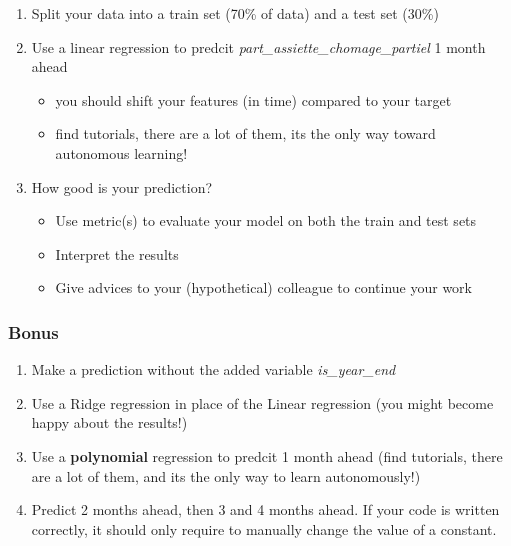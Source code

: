\begin{enumerate}
    \item Split your data into a train set (70\% of data) and a test set (30\%)
    \item Use a linear regression to predcit \textit{part\_assiette\_chomage\_partiel} 1 month ahead
    \begin{itemize}
        \item you should shift your features (in time) compared to your target
        \item find tutorials, there are a lot of them, its the only way toward autonomous learning!
    \end{itemize}
    \item How good is your prediction?
    \begin{itemize}
        \item Use metric(s) to evaluate your model on both the train and test sets
        \item Interpret the results
        \item Give advices to your (hypothetical) colleague to continue your work
    \end{itemize}
\end{enumerate}



\subsubsection{Bonus}

\begin{enumerate}
    \item Make a prediction without the added variable \textit{is\_year\_end}
    \item Use a Ridge regression in place of the Linear regression (you might become happy about the results!)
    \item Use a \textbf{polynomial} regression to predcit 1 month ahead (find tutorials, there are a lot of them, and its the only way to learn autonomously!)
    \item Predict 2 months ahead, then 3 and 4 months ahead. If your code is written correctly, it should only require to manually change the value of a constant.
\end{enumerate}


